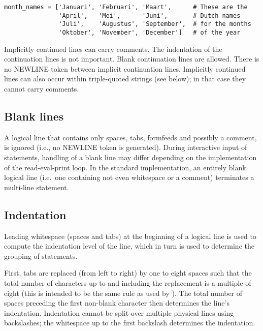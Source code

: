 \begin{verbatim}
month_names = ['Januari', 'Februari', 'Maart',      # These are the
               'April',   'Mei',      'Juni',       # Dutch names
               'Juli',    'Augustus', 'September',  # for the months
               'Oktober', 'November', 'December']   # of the year
\end{verbatim}

Implicitly continued lines can carry comments.  The indentation of the
continuation lines is not important.  Blank continuation lines are
allowed.  There is no NEWLINE token between implicit continuation
lines.  Implicitly continued lines can also occur within triple-quoted
strings (see below); in that case they cannot carry comments.


\subsection{Blank lines \label{blank-lines}}

A logical line that contains only spaces, tabs, formfeeds and possibly
a comment, is ignored (i.e., no NEWLINE token is generated).  During
interactive input of statements, handling of a blank line may differ
depending on the implementation of the read-eval-print loop.  In the
standard implementation, an entirely blank logical line (i.e.\ one
containing not even whitespace or a comment) terminates a multi-line
statement.


\subsection{Indentation\label{indentation}}

Leading whitespace (spaces and tabs) at the beginning of a logical
line is used to compute the indentation level of the line, which in
turn is used to determine the grouping of statements.

First, tabs are replaced (from left to right) by one to eight spaces
such that the total number of characters up to and including the
replacement is a multiple of
eight (this is intended to be the same rule as used by \UNIX).  The
total number of spaces preceding the first non-blank character then
determines the line's indentation.  Indentation cannot be split over
multiple physical lines using backslashes; the whitespace up to the
first backslash determines the indentation.

